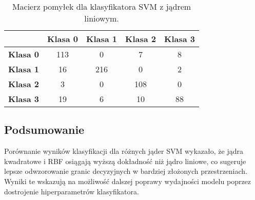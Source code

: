 \begin{table}[h!]
\centering
\begin{tabular}{|c|c|c|c|c|}
\hline
\textbf{} & \textbf{Klasa 0} & \textbf{Klasa 1} & \textbf{Klasa 2} & \textbf{Klasa 3} \\ \hline
\textbf{Klasa 0} & 113 & 0 & 7 & 8 \\ \hline
\textbf{Klasa 1} & 16 & 216 & 0 & 2 \\ \hline
\textbf{Klasa 2} & 3 & 0 & 108 & 0 \\ \hline
\textbf{Klasa 3} & 19 & 6 & 10 & 88 \\ \hline
\end{tabular}
\caption{Macierz pomyłek dla klasyfikatora SVM z jądrem liniowym.}
\label{tab:confusion_matrix_linear}
\end{table}

\subsection{Podsumowanie}
Porównanie wyników klasyfikacji dla różnych jąder SVM wykazało, że jądra kwadratowe i RBF osiągają wyższą dokładność niż jądro liniowe, co sugeruje lepsze odwzorowanie granic decyzyjnych w bardziej złożonych przestrzeniach. Wyniki te wskazują na możliwość dalszej poprawy wydajności modelu poprzez dostrojenie hiperparametrów klasyfikatora.
